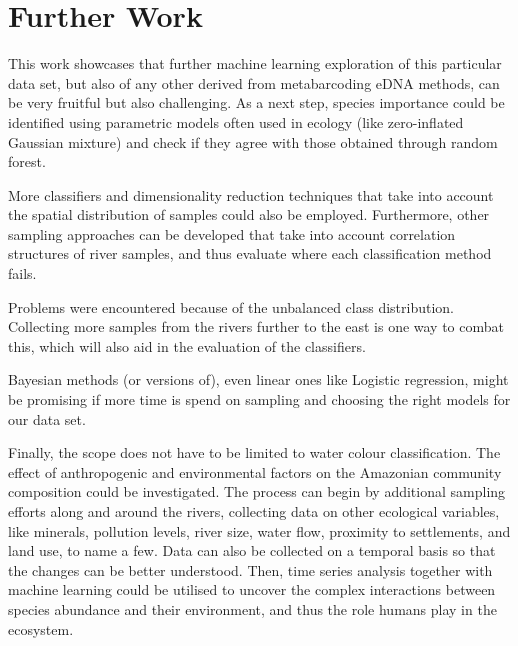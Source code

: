 \section*{Further Work}

This work showcases that further machine learning exploration of this particular data set, but also of any other derived from metabarcoding eDNA methods, can be very fruitful but also challenging. As a next step, species importance could be identified using parametric models often used in ecology (like zero-inflated Gaussian mixture) and check if they agree with those obtained through random forest. 

 More classifiers and dimensionality reduction techniques that take into account the spatial distribution of samples could also be employed. Furthermore, other sampling approaches can be developed that take into account correlation structures of river samples, and thus evaluate where each classification method fails.
 
 Problems were encountered because of the unbalanced class distribution. Collecting more samples from the rivers further to the east is one way to combat this, which will also aid in the evaluation of the classifiers.
 
 Bayesian methods (or versions of), even linear ones like Logistic regression, might be promising if more time is spend on sampling and choosing the right models for our data set. 
 
 Finally, the scope does not have to be limited to water colour classification. The effect of anthropogenic and environmental factors on the Amazonian community composition could be investigated. The process can begin by additional sampling efforts along and around the rivers, collecting data on other ecological variables, like minerals, pollution levels, river size, water flow, proximity to settlements, and land use, to name a few. Data can also be collected on a temporal basis so that the changes can be better understood. Then, time series analysis together with machine learning could be utilised to uncover the complex interactions between species abundance and their environment, and thus the role humans play in the ecosystem.

